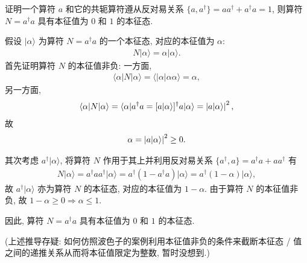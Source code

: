 \documentclass{assignment}
\begin{document}
\begin{prob}[课本习题 7.7]
    证明一个算符 $a$ 和它的共轭算符遵从反对易关系 $\{a,a^{\dagger}\}=aa^{\dagger}+a^{\dagger}a=1$, 则算符 $N=a^{\dagger}a$ 具有本征值为 $0$ 和 $1$ 的本征态.
\end{prob}
\begin{pf}
    假设 $\lvert\alpha\rangle$ 为算符 $N=a^{\dagger}a$ 的一个本征态, 对应的本征值为 $\alpha$:
    \begin{align}
        N\lvert\alpha\rangle=\alpha\lvert\alpha\rangle.
    \end{align}
    首先证明算符 $N$ 的本征值非负: 一方面,
    \begin{align}
        \langle\alpha\rvert N\lvert\alpha\rangle=\langle\rvert\alpha\lvert\alpha\alpha\rangle=\alpha,
    \end{align}
    另一方面,
    \begin{align}
        \langle\alpha\rvert N\lvert\alpha\rangle=\langle\alpha\rvert a^{\dagger}a=[a\lvert\alpha\rangle]^{\dagger}a\lvert\alpha\rangle=\left\lvert a\lvert\alpha\rangle\right\rvert^2,
    \end{align}
    故
    \begin{align}
        \alpha=\left\lvert a\lvert\alpha\rangle\right\rvert^2\geq 0.
    \end{align}

    其次考虑 $a^{\dagger}\lvert\alpha\rangle$, 将算符 $N$ 作用于其上并利用反对易关系 $\{a^{\dagger},a\}=a^{\dagger}a+aa^{\dagger}$ 有
    \begin{align}
        N\lvert\alpha\rangle=a^{\dagger}aa^{\dagger}\lvert\alpha\rangle=a^{\dagger}(1-a^{\dagger}a)\lvert\alpha\rangle=a^{\dagger}(1-\alpha)\lvert\alpha\rangle,
    \end{align}
    故 $a^{\dagger}\lvert\alpha\rangle$ 亦为算符 $N$ 的本征态, 对应的本征值为 $1-\alpha$. 由于算符 $N$ 的本征值非负, 故 $1-\alpha\geq 0\Longrightarrow\alpha\leq 1$.

    因此, 算符 $N=a^{\dagger}a$ 具有本征值为 $0$ 和 $1$ 的本征态.

    (上述推导存疑: 如何仿照波色子的案例利用本征值非负的条件来截断本征态 / 值之间的递推关系从而将本征值限定为整数, 暂时没想到.)
\end{pf}
\end{document}
